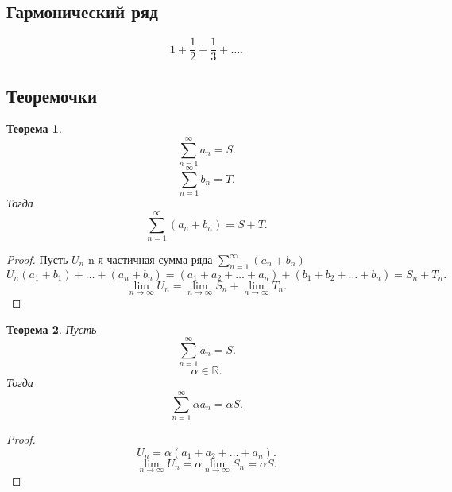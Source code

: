 \documentclass{scrartcl}
\newtheorem{theorem}{Теорема}
\begin{document}
\subsection{Гармонический ряд}
\[
1 + \frac{1}{2} + \frac{1}{3} + \dots
.\] 
\subsection{Теоремочки}
\begin{theorem}
    \[
    \sum_{n=1}^{\infty} a_{n} = S
    .\] 
    \[
    \sum_{n=1}^{\infty} b_{n} = T
    .\] 
    Тогда
    \[
    \sum_{n=1}^{\infty} (a_{n} + b_{n}) = S + T
    .\] 
\end{theorem}
\begin{proof}
    Пусть  $U_{n}$ n-я частичная сумма ряда $\sum_{n=1}^{\infty} (a_{n} + b_{n})$
    \[
    U_{n} (a_1 + b_1) + \dots + (a_{n} +b_{n}) = (a_1 + a_2 + \dots + a_{n}) + (b_1 + b_2 + \dots + b_{n}) = S_{n} + T_{n}
    .\] 
    \[
    \lim_{n \to \infty}U_{n} = \lim_{n \to \infty} S_{n} + \lim_{n \to \infty} T_{n}
    .\] 
\end{proof}
\begin{theorem}
    Пусть 
    \[
        \sum_{n=1}^{\infty} a_{n} = S
    .\] 
    \[
        \alpha \in \mathbb{R}
    .\] 
    Тогда
    \[
    \sum_{n=1}^{\infty} \alpha a_{n} = \alpha S
    .\] 
\end{theorem}
\begin{proof}
    \[
    U_{n} = \alpha (a_1 + a_2 + \dots+ a_{n})
    .\] 
    \[
    \lim_{n \to \infty} U_{n} = \alpha \lim_{n \to \infty} S_{n} = \alpha S
    .\] 
\end{proof}
\end{document}
